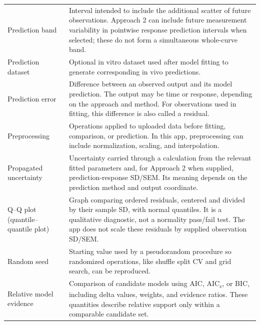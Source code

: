 \begin{longtable}{@{}>{\raggedright\arraybackslash}p{}>{\raggedright\arraybackslash}p{}@{}}
Prediction band & Interval intended to include the additional scatter of future observations. Approach 2 can include future measurement variability in pointwise response prediction intervals when selected; these do not form a simultaneous whole-curve band. \\

Prediction dataset & Optional in vitro dataset used after model fitting to generate corresponding in vivo predictions. \\

Prediction error & Difference between an observed output and its model prediction. The output may be time or response, depending on the approach and method. For observations used in fitting, this difference is also called a residual. \\

Preprocessing & Operations applied to uploaded data before fitting, comparison, or prediction. In this app, preprocessing can include normalization, scaling, and interpolation. \\

Propagated uncertainty & Uncertainty carried through a calculation from the relevant fitted parameters and, for Approach 2 when supplied, prediction-response SD/SEM. Its meaning depends on the prediction method and output coordinate. \\

Q--Q plot (quantile--quantile plot) & Graph comparing ordered residuals, centered and divided by their sample SD, with normal quantiles. It is a qualitative diagnostic, not a normality pass/fail test. The app does not scale these residuals by supplied observation SD/SEM. \\


Random seed & Starting value used by a pseudorandom procedure so randomized operations, like shuffle split CV and grid search, can be reproduced. \\

Relative model evidence & Comparison of candidate models using AIC, AIC\textsubscript{c}, or BIC, including delta values, weights, and evidence ratios. These quantities describe relative support only within a comparable candidate set. \\


\end{longtable}
